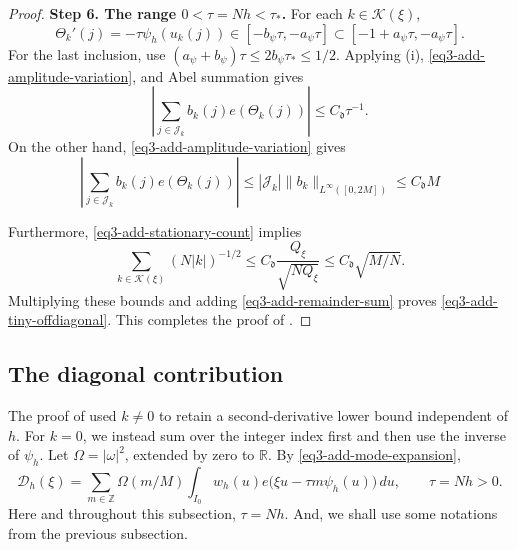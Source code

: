 \documentclass[reqno,12pt]{amsart}
\def \Z {\mathbb Z}
\def \R {\mathbb R}
\numberwithin{equation}{section}
\begin{document}
\begin{proof}
\medskip
\noindent\textbf{Step 6. The range $0<\tau=Nh<\tau_*$.}
For each $k\in\mathcal K(\xi)$,
\[
 \Theta_k'(j)=-\tau\psi_h(u_k(j))
       \in[-b_\psi\tau,-a_\psi\tau]
       \subset[-1+a_\psi\tau,-a_\psi\tau].
\]
For the last inclusion, use
$(a_\psi+b_\psi)\tau\le2b_\psi\tau_*\le1/2$.
Applying
(i),
\eqref{eq3-add-amplitude-variation}, and Abel summation gives
$$ \left|\sum_{j\in\mathcal J_k}b_k(j)e(\Theta_k(j))\right|
\le C_{\mathfrak d}\tau^{-1}.$$
On the other hand, \eqref{eq3-add-amplitude-variation} gives
$$ \left|\sum_{j\in\mathcal J_k}b_k(j)e(\Theta_k(j))\right|
\le |\mathcal J_k|\|b_k\|_{L^\infty([0,2M])}\le C_{\mathfrak d} M$$

Furthermore, \eqref{eq3-add-stationary-count} implies
\[
 \sum_{k\in\mathcal K(\xi)}(N|k|)^{-1/2}
 \le C_{\mathfrak d}\frac{Q_\xi}{\sqrt{NQ_\xi}}
 \le C_{\mathfrak d}\sqrt{M/N}.
\]
Multiplying these bounds and adding
\eqref{eq3-add-remainder-sum} proves
\eqref{eq3-add-tiny-offdiagonal}. 
This completes the proof of .
\end{proof}

\subsection{The diagonal contribution}\label{sec3:diagonal}

The proof of  used $k\ne0$ to
retain a second-derivative lower bound independent of $h$.
For $k=0$, we instead sum over the integer index first and then
use the inverse of $\psi_h$. 
Let $\Omega=|\omega|^2$, extended by zero to $\R$. By
\eqref{eq3-add-mode-expansion},
\begin{equation}
 \mathcal D_h(\xi)=\sum_{m\in\Z}\Omega(m/M)
 \int_{I_0}w_h(u)e\bigl(\xi u-\tau m\psi_h(u)\bigr)\,du,
 \qquad \tau=Nh>0.
 \label{eq3-add-diagonal-original}
\end{equation}
Here and throughout this subsection, $\tau=Nh$. And, we shall use some notations from the previous subsection.
\end{document}
